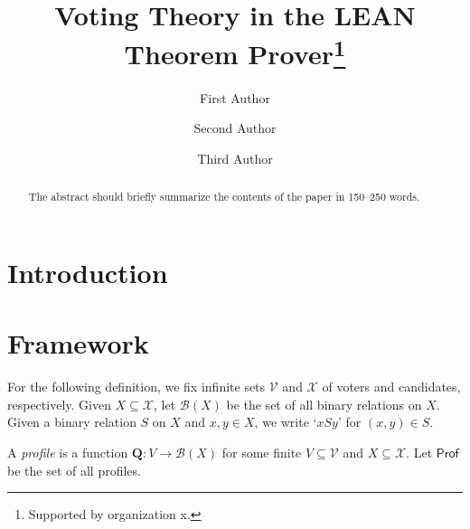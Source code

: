 \documentclass[runningheads]{llncs}
\begin{document}
%
\title{Voting Theory in the LEAN Theorem Prover\thanks{Supported by organization x.}}
%
%
\author{First Author \and
Second Author \and
Third Author}
%
%
%
\maketitle              %
%
\begin{abstract}
The abstract should briefly summarize the contents of the paper in
150--250 words.

\end{abstract}
%
%
%

\section{Introduction}

\section{Framework}

For the following definition, we fix infinite sets $\mathcal{V}$ and $\mathcal{X}$ of voters and candidates, respectively. Given $X\subseteq\mathcal{X}$, let $\mathcal{B}(X)$ be the set of all binary relations on $X$. Given a binary relation $S$ on $X$ and $x,y\in X$, we write `$xSy$' for $(x,y)\in S$.

\begin{definition} \textnormal{A \emph{profile} is a function $\mathbf{Q}:V\to \mathcal{B}(X)$ for some finite $V\subseteq\mathcal{V}$ and $X\subseteq\mathcal{X}$. Let $\mathsf{Prof}$ be the set of all profiles.}
\end{definition}
\end{document}
